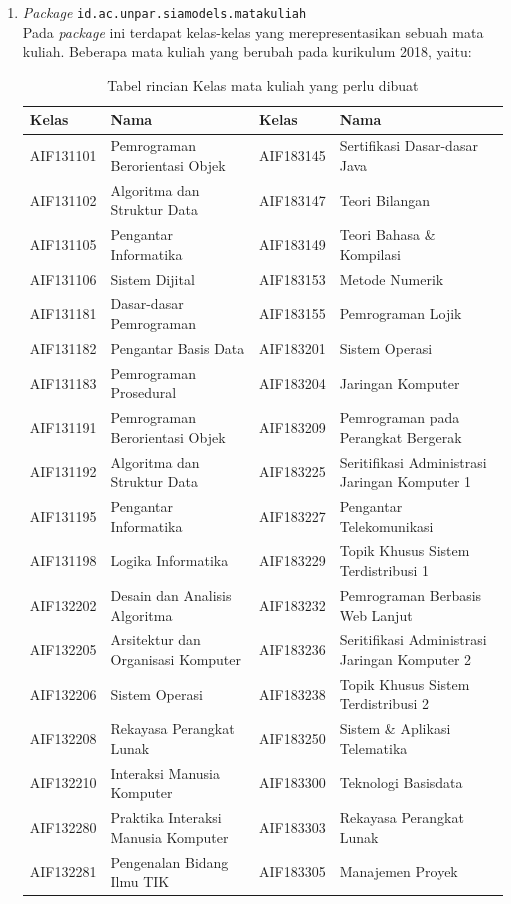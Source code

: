 \begin{enumerate}
	\item \textit{Package} \texttt{id.ac.unpar.siamodels.matakuliah} \\
	Pada \textit{package} ini terdapat kelas-kelas yang merepresentasikan sebuah mata kuliah. Beberapa mata kuliah yang berubah pada kurikulum 2018, yaitu:
\begin{table}[H]
\centering
\caption{Tabel rincian Kelas mata kuliah yang perlu dibuat}
\label{tab:kelasmatakuliah2018}
\begin{tabular}{|p{3.25cm}|p{4.25cm}|p{3.25cm}|p{4.25cm}|}
\hline
\textbf{Kelas} & \textbf{Nama} & \textbf{Kelas} & \textbf{Nama} \\ \hline
AIF131101 & Pemrograman Berorientasi Objek & AIF183145 & Sertifikasi Dasar-dasar Java \\ \hline
AIF131102 & Algoritma dan Struktur Data & AIF183147 & Teori Bilangan \\ \hline
AIF131105 & Pengantar Informatika & AIF183149 & Teori Bahasa \& Kompilasi \\ \hline
AIF131106 & Sistem Dijital & AIF183153 & Metode Numerik \\ \hline
AIF131181 & Dasar-dasar Pemrograman & AIF183155 & Pemrograman Lojik \\ \hline
AIF131182 & Pengantar Basis Data & AIF183201 & Sistem Operasi \\ \hline
AIF131183 & Pemrograman Prosedural & AIF183204 & Jaringan Komputer \\ \hline
AIF131191 & Pemrograman Berorientasi Objek & AIF183209 & Pemrograman pada Perangkat Bergerak \\ \hline
AIF131192 & Algoritma dan Struktur Data & AIF183225 & Seritifikasi Administrasi Jaringan Komputer 1 \\ \hline
AIF131195 & Pengantar Informatika & AIF183227 & Pengantar Telekomunikasi \\ \hline
AIF131198 & Logika Informatika & AIF183229 & Topik Khusus Sistem Terdistribusi 1 \\ \hline
AIF132202 & Desain dan Analisis Algoritma & AIF183232 & Pemrograman Berbasis Web Lanjut \\ \hline
AIF132205 & Arsitektur dan Organisasi Komputer & AIF183236 & Seritifikasi Administrasi Jaringan Komputer 2 \\ \hline
AIF132206 & Sistem Operasi & AIF183238 & Topik Khusus Sistem Terdistribusi 2 \\ \hline
AIF132208 & Rekayasa Perangkat Lunak & AIF183250 & Sistem \& Aplikasi Telematika \\ \hline
AIF132210 & Interaksi Manusia Komputer & AIF183300 & Teknologi Basisdata \\ \hline
AIF132280 & Praktika Interaksi Manusia Komputer & AIF183303 & Rekayasa Perangkat Lunak \\ \hline
AIF132281 & Pengenalan Bidang Ilmu TIK & AIF183305 & Manajemen Proyek \\ \hline
\end{tabular}
\end{table}


\end{enumerate}
